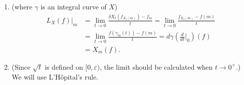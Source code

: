 \begin{enumerate}
\begin{align*}
& =\frac{1}{(p+q)!} \sum_{\pi: p, q \text{ shuffles}} \sum_{\sigma_{1} \in S_{p}} \sum_{\sigma_{2} \in S_{q}} \operatorname{sgn}(\pi) \operatorname{sgn}(\sigma_{1}) \operatorname{sgn}(\sigma_{2}) 
\prod_{i_{1}=1}^{p} w_{i_{1}}^{*} v_{\pi(\sigma_{1}(i_{1}))} 
\prod_{i_{2}=1}^{q} w_{p+i_{2}}^{*} v_{\pi(p+\sigma_{2}(i_{2}))} \\
& =\frac{1}{(p+q)!} \sum_{\pi: p, q \text{ shuffles}} \operatorname{sgn}(\pi) \det(w_{i}^{*} v_{\pi(i)})_{1 \leq i \leq p} \det(w_{j}^{*} v_{\pi(j)})_{p+1 \leq j \leq p+q} \\
& =\frac{p!q!}{(p+q)!} \sum_{\pi \in S_{p+q}} \operatorname{sgn}(\pi) \det(w_{i}^{*} v_{\pi(i)})_{1 \leq i \leq p} \det(w_{j}^{*} v_{\pi(j)})_{p+1 \leq j \leq p+q} \\
& =\frac{1}{(p+q)!} \sum_{\pi \in S_{p+q}} \operatorname{sgn}(\pi) f(v_{\pi(1)}, \ldots, v_{\pi(p)}) g(v_{\pi(p+1)}, \ldots, v_{\pi(p+q)}).
\end{align*}
Therefore,
\begin{align*}
f \wedge_{\alpha} g(v_{1}, \ldots, v_{p+q}) & =\sum_{\pi: p, q \text{ shuffles}} \operatorname{sgn}(\pi) f(v_{\pi(1)}, \ldots, v_{\pi(p)}) g(v_{\pi(p+1)}, \ldots, v_{\pi(p+q)}) \\
& =\frac{1}{p!q!} \sum_{\pi \in S_{p+q}} \operatorname{sgn}(\pi) f(v_{\pi(1)}, \ldots, v_{\pi(p)}) g(v_{\pi(p+1)}, \ldots, v_{\pi(p+q)}) \\
& =\frac{(p+q)!}{p!q!} f \wedge_{\beta} g.
\end{align*}
\item (where $\gamma$ is an integral curve of $X$)
\begin{align*}
L_{X}(f)|_{m} & =\lim_{t \rightarrow 0} \frac{\delta X_{t}(f_{X_{t}(m)})-f_{m}}{t}
=\lim_{t \rightarrow 0} \frac{f_{X_{t}(m)}-f(m)}{t} \\
& =\lim_{t \rightarrow 0} \frac{f(\gamma_{m}(t))-f(m)}{t}
=d \gamma\left(\frac{d}{d t}\bigg|_{0}\right)(f) \\
& =X_{m}(f).
\end{align*}
\item (Since $\sqrt{t}$ is defined on $[0, \varepsilon)$, the limit should be calculated when $t \rightarrow 0^{+}$.) We will use L'Hôpital's rule.


\end{enumerate}
